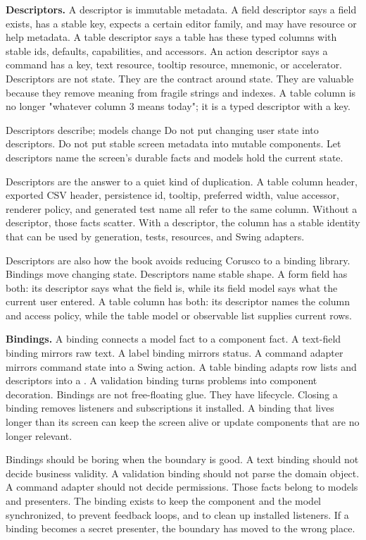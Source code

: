 \textbf{Descriptors.} A descriptor is immutable metadata. A field descriptor says a field exists, has a stable key, expects a certain editor family, and may have resource or help metadata. A table descriptor says a table has these typed columns with stable ids, defaults, capabilities, and accessors. An action descriptor says a command has a key, text resource, tooltip resource, mnemonic, or accelerator. Descriptors are not state. They are the contract around state. They are valuable because they remove meaning from fragile strings and indexes. A table column is no longer "whatever column 3 means today"; it is a typed descriptor with a key.

\begin{principlebox}{Descriptors describe; models change}
Do not put changing user state into descriptors. Do not put stable screen metadata into mutable components. Let descriptors name the screen's durable facts and models hold the current state.
\end{principlebox}

Descriptors are the answer to a quiet kind of duplication. A table column header, exported CSV header, persistence id, tooltip, preferred width, value accessor, renderer policy, and generated test name all refer to the same column. Without a descriptor, those facts scatter. With a descriptor, the column has a stable identity that can be used by generation, tests, resources, and Swing adapters.

Descriptors are also how the book avoids reducing Corusco to a binding library. Bindings move changing state. Descriptors name stable shape. A form field has both: its descriptor says what the field is, while its field model says what the current user entered. A table column has both: its descriptor names the column and access policy, while the table model or observable list supplies current rows.

\textbf{Bindings.} A binding connects a model fact to a component fact. A text-field binding mirrors raw text. A label binding mirrors status. A command adapter mirrors command state into a Swing action. A table binding adapts row lists and descriptors into a . A validation binding turns problems into component decoration. Bindings are not free-floating glue. They have lifecycle. Closing a binding removes listeners and subscriptions it installed. A binding that lives longer than its screen can keep the screen alive or update components that are no longer relevant.

Bindings should be boring when the boundary is good. A text binding should not decide business validity. A validation binding should not parse the domain object. A command adapter should not decide permissions. Those facts belong to models and presenters. The binding exists to keep the component and the model synchronized, to prevent feedback loops, and to clean up installed listeners. If a binding becomes a secret presenter, the boundary has moved to the wrong place.

